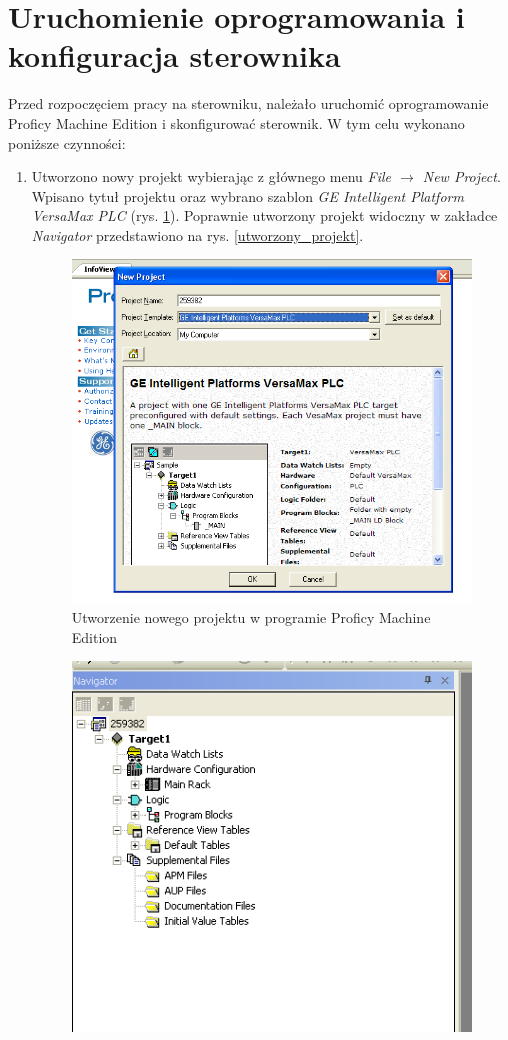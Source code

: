 \documentclass[12pt]{article}
\begin{document}
\section{Uruchomienie oprogramowania i konfiguracja sterownika}
Przed rozpoczęciem pracy na sterowniku, należało uruchomić oprogramowanie Proficy Machine Edition i skonfigurować sterownik. W tym celu wykonano poniższe czynności:
\begin{enumerate}
    \item Utworzono nowy projekt wybierając z głównego menu \textit{File $\rightarrow$ New Project}. Wpisano tytuł projektu oraz wybrano szablon \textit{GE Intelligent Platform VersaMax PLC} (rys. \ref{nowy_projekt}). Poprawnie utworzony projekt widoczny w zakładce \textit{Navigator} przedstawiono na rys. \ref{utworzony_projekt}.
    \begin{figure}[H]
        \centering
        \includegraphics[scale=0.55]{./zdj/nowy_projekt.png}
        \caption{Utworzenie nowego projektu w programie Proficy Machine Edition}
        \label{nowy_projekt}
    \end{figure}
    \begin{figure}[H]
        \centering
        \includegraphics[scale=0.7]{./zdj/utworzony_projekt.png}

\end{figure}
\end{enumerate}
\end{document}
